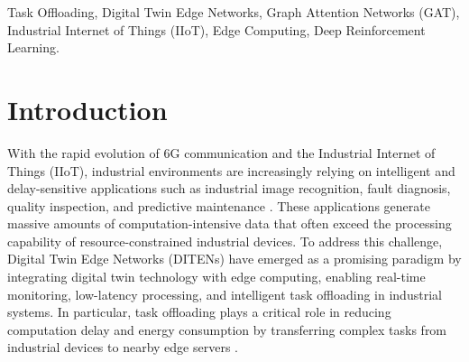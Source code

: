 \documentclass[conference]{IEEEtran}
\begin{document}
\begin{abstract}
Task offloading in Digital Twin Edge Networks (DITENs) has become a critical enabler for supporting delay-sensitive and computation-intensive industrial applications such as image recognition. Existing approaches, including GCN-enabled multi-agent deep reinforcement learning frameworks, have shown promising performance in modeling task dependencies and optimizing delay-energy trade-offs. However, these methods still have limitations in representing the varying importance of task dependencies and dynamic device-server connections in industrial environments. To address these challenges, this paper proposes a graph-attention-enhanced task offloading framework that integrates Graph Attention Networks (GATs) with reinforcement learning. Unlike conventional approaches that mainly rely on raw or uniformly aggregated graph representations, the proposed method leverages GAT to dynamically capture complex relationships among subtasks, industrial devices, and edge servers. Specifically, GAT is used to extract attention-aware representations from both the task dependency graph and the network topology graph, enabling a more expressive and adaptive state representation for offloading decision-making. In addition, a coverage-aware action masking mechanism is adopted to remove infeasible offloading actions and improve learning efficiency. Experimental evaluations demonstrate that the proposed approach achieves superior performance compared to existing methods, with improvements in system reward, reduced latency, and lower energy consumption. The proposed model also exhibits improved robustness in dynamic industrial edge environments.
\end{abstract}

\begin{IEEEkeywords}
Task Offloading, Digital Twin Edge Networks, Graph Attention Networks (GAT), Industrial Internet of Things (IIoT), Edge Computing, Deep Reinforcement Learning.
\end{IEEEkeywords}

\section{Introduction}

With the rapid evolution of 6G communication and the Industrial Internet of Things (IIoT), industrial environments are increasingly relying on intelligent and delay-sensitive applications such as industrial image recognition, fault diagnosis, quality inspection, and predictive maintenance \cite{10892268}. These applications generate massive amounts of computation-intensive data that often exceed the processing capability of resource-constrained industrial devices. To address this challenge, Digital Twin Edge Networks (DITENs) have emerged as a promising paradigm by integrating digital twin technology with edge computing, enabling real-time monitoring, low-latency processing, and intelligent task offloading in industrial systems. In particular, task offloading plays a critical role in reducing computation delay and energy consumption by transferring complex tasks from industrial devices to nearby edge servers \cite{satyanarayanan2017emergence,wang2020convergence}.
\end{document}
